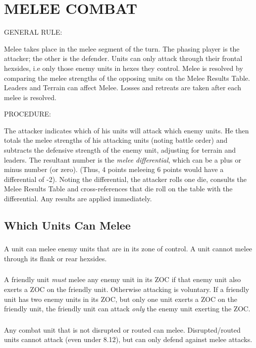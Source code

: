 \section{MELEE COMBAT}
\hfill

GENERAL RULE:

Melee takes place in the melee segment of the turn. The phasing player is the attacker; the other is the defender. Units can only attack through their frontal hexsides, i.e only those enemy units in hexes they control. Melee is resolved by comparing the melee strengths of the opposing units on the Melee Results Table. Leaders and Terrain can affect Melee. Losses and retreats are taken after each melee is resolved.

PROCEDURE:

The attacker indicates which of his units will attack which enemy units. He then totals the melee strengths of his attacking units (noting battle order) and subtracts the defensive strength of the enemy unit, adjusting for terrain and leaders. The resultant number is the \textit{melee differential}, which can be a plus or minus number (or zero). (Thus, 4 points meleeing 6 points would have a differential of -2). Noting the differential, the attacker rolls one die, consults the Melee Results Table and cross-references that die roll on the table with the differential. Any results are applied immediately.

\subsection{Which Units Can Melee}

\subsubsection[ZoC]{} A unit can melee enemy units that are in its zone of control. A unit cannot melee through its flank or rear hexsides.

\subsubsection[Mandatory Attacks]{} A friendly unit \textit{must} melee any enemy unit in its ZOC if that enemy unit also exerts a ZOC on the friendly unit. Otherwise attacking is voluntary. If a friendly unit has two enemy units in its ZOC, but only one unit exerts a ZOC on the friendly unit, the friendly unit can attack \textit{only} the enemy unit exerting the ZOC.

\subsubsection[Disrupted Units]{} Any combat unit that is not disrupted or routed can melee. Disrupted/routed units cannot attack (even under 8.12), but can only defend against melee attacks.


